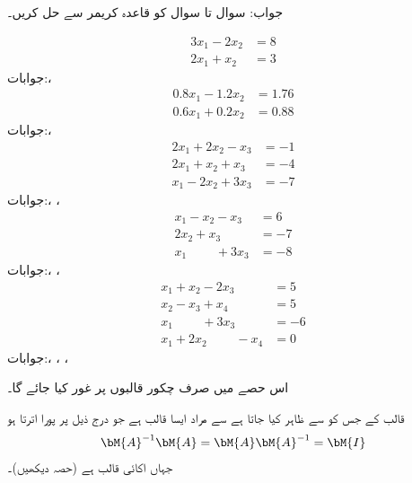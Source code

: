 جواب:
سوال  تا سوال  کو قاعدہ کریمر سے حل کریں۔

\begin{align*}
3x_1-2x_2&=8\\
2x_1+x_2&=3
\end{align*}
جوابات:، 
\begin{align*}
0.8x_1-1.2x_2&=1.76\\
0.6x_1+0.2x_2&=0.88
\end{align*}
جوابات:، 
\begin{align*}
2x_1+2x_2-x_3&=-1\\
2x_1+x_2+x_3&=-4\\
x_1-2x_2+3x_3&=-7
\end{align*}
جوابات:، ، 
\begin{align*}
x_1-x_2-x_3&=6\\
2x_2+x_3&=-7\\
x_1\phantom{-2x_2}+3x_3&=-8
\end{align*}
جوابات:، ، 
\begin{align*}
x_1+x_2-2x_3\phantom{+x_4}&=5\\
x_2-x_3+x_4&=5\\
x_1\phantom{+2x_2}+3x_3\phantom{-x_4}&=-6\\
x_1+2x_2\phantom{+3x_3}-x_4&=0
\end{align*}
جوابات:، ، ،  

اس حصے میں صرف چکور قالبوں پر غور کیا جائے گا۔ 

 قالب  کے  جس کو  سے ظاہر کیا جاتا ہے سے مراد ایسا  قالب ہے جو درج ذیل پر پورا اترتا ہو
\begin{align}\label{مساوات_الجبرا_جارڈن_گاوس_اسقاط}
\bM{A}^{-1}\bM{A}=\bM{A}\bM{A}^{-1}=\bM{I}
\end{align}
جہاں  اکائی  قالب ہے (حصہ  دیکھیں)۔

